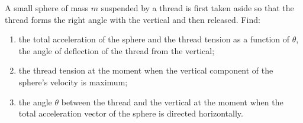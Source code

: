 
\item A small sphere of mass $m$ suspended by a thread is first taken aside so that the thread forms the right angle with the vertical and then released. Find:
    \begin{enumerate}
        \item the total acceleration of the sphere and the thread tension as a function of $\theta$, the angle of deflection of the thread from the vertical;
        \item the thread tension at the moment when the vertical component of the sphere's velocity is maximum;
        \item the angle $\theta$ between the thread and the vertical at the moment when the total acceleration vector of the sphere is directed horizontally.
    \end{enumerate}
